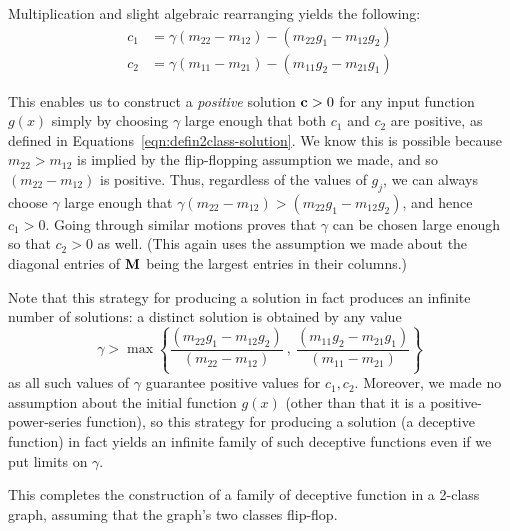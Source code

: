  Multiplication and slight algebraic rearranging yields the following:
 \begin{align}
   c_1 &= \gamma(m_{22} - m_{12}) - (m_{22}g_1 - m_{12} g_2 ) \label{eqn:defin2class-solution} \\
   c_2 &= \gamma( m_{11} - m_{21} ) - (m_{11}g_2 - m_{21}g_1)
 \end{align}

This enables us to construct a \emph{positive} solution $\textbf{c} > 0$ for any input function $g(x)$ simply by choosing $\gamma$ large enough that both $c_1$ and $c_2$ are positive, as defined in Equations~\eqref{eqn:defin2class-solution}.
We know this is possible because $m_{22}  > m_{12}$ is implied by the flip-flopping assumption we made, and so $(m_{22} - m_{12})$ is positive.
Thus, regardless of the values of $g_j$, we can always choose $\gamma$ large enough that $\gamma(m_{22} - m_{12}) > (m_{22}g_1 - m_{12} g_2 )$, and hence $c_1 > 0$.
Going through similar motions proves that $\gamma$ can be chosen large enough so that $c_2 > 0$ as well.
(This again uses the assumption we made about the diagonal entries of $\textbf{M}$ being the largest entries in their columns.)

Note that this strategy for producing a solution in fact produces an infinite number of solutions: a distinct solution is obtained by any value
\[
\gamma > \max\left\{  \frac{(m_{22}g_1 - m_{12} g_2 )}{(m_{22} - m_{12})} ~,~   \frac{(m_{11}g_2 - m_{21}g_1)}{( m_{11} - m_{21} )}  \right\}
\]
as all such values of $\gamma$ guarantee positive values for $c_1, c_2$.
Moreover, we made no assumption about the initial function $g(x)$ (other than that it is a positive-power-series function), so this strategy for producing a solution (a deceptive function) in fact yields an infinite family of such deceptive functions even if we put limits on $\gamma$.

This completes the construction of a family of deceptive function in a 2-class graph, assuming that the graph's two classes flip-flop.

